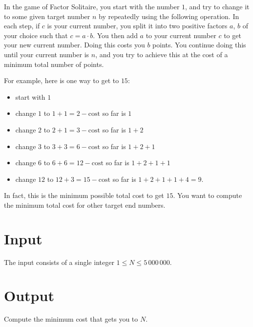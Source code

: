 In the game of Factor Solitaire, you start with the number $1$, and try to change it to some given target number $n$ by repeatedly using the following operation. In each step, if $c$ is your current number, you split it into two positive factors $a$, $b$ of your choice such that $c = a \cdot b$. You then add $a$ to your current number $c$ to get your new current number. Doing this costs you $b$ points. You continue doing this until your current number is $n$, and you try to achieve this at the cost of a minimum total number of points.

For example, here is one way to get to $15$:

\begin{itemize}
    \item start with $1$
    \item change $1$ to $1+1=2-\mathrm{cost}$ so far is $1$
    \item change $2$ to $2+1=3-\mathrm{cost}$ so far is $1+2$
    \item change $3$ to $3+3=6-\mathrm{cost}$ so far is $1+2+1$
    \item change $6$ to $6+6=12-\mathrm{cost}$ so far is $1+2+1+1$
    \item change $12$ to $12+3=15-\mathrm{cost}$ so far is $1+2+1+1+4=9$.
\end{itemize}
In fact, this is the minimum possible total cost to get $15$. You want to compute the minimum total cost for other target end numbers.

\section*{Input}
The input consists of a single integer $1\leq N \leq 5\,000\,000$.

\section*{Output}
Compute the minimum cost that gets you to $N$.

